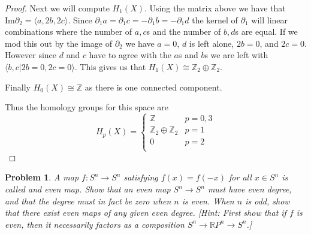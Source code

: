 \documentclass[10pt]{article}
\newcommand{\sk}{\vskip 10mm}
\newcommand{\bb}[1]{\mathbb{#1}}
\theoremstyle{plain}
\newtheorem{problem}{Problem}
\theoremstyle{remark}
\begin{document}
\begin{proof}
  Next we will compute $H_1(X)$. Using the matrix above we have that
  $\mathrm{Im}\partial_2=\langle a,2b,2c\rangle$. Since $\partial_1 a=\partial_1 c=-\partial_1 b=-\partial_1 d$ the
  kernel of $\partial_1$ will linear combinations where the number of $a,c$s and
  the number of $b,d$s are equal. If we mod this out by the image of
  $\partial_2$ we have $a=0$, $d$ is left alone, $2b=0$, and $2c=0$. However
  since $d$ and $c$ have to agree with the $a$s and $b$s we are left
  with $\langle b,c|2b=0,2c=0\rangle$. This gives us that
  $H_1(X)\cong \bb{Z}_2\oplus\bb{Z}_2$.

  Finally $H_0(X)\cong \bb{Z}$ as there is one connected component.

  Thus the homology groups for this space are
  \[
    H_p(X) = 
    \left\{
      \begin{array}{lr}
        \bb{Z}& p=0,3\\
        \bb{Z}_2\oplus\bb{Z}_2 & p=1\\
        0 & p=2\\
      \end{array}
    \right.
  \] 
\end{proof}

\sk

\begin{problem}
  A map $f:S^n\rightarrow S^n$ satisfying $f(x)=f(-x)$ for all $x\in S^n$ is called and
  \textit{even map}. Show that an even map $S^n\rightarrow S^n$ must have even degree,
  and that the degree must in fact be zero when $n$ is even. When $n$ is odd,
  show that there exist even maps of any given even degree.
  [Hint: First show that if $f$ is even, then it necessarily factors as a
  composition $S^n\rightarrow \bb{R}P^n\rightarrow S^n$.]
\end{problem}
\end{document}
